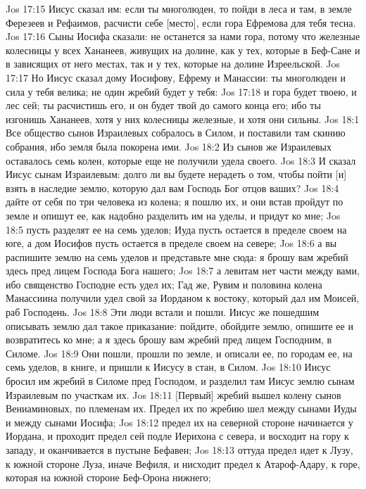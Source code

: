Jos 17:15  Иисус сказал им: если ты многолюден, то пойди в леса и там, в земле Ферезеев и Рефаимов, расчисти себе [место], если гора Ефремова для тебя тесна.
Jos 17:16  Сыны Иосифа сказали: не останется за нами гора, потому что железные колесницы у всех Хананеев, живущих на долине, как у тех, которые в Беф-Сане и в зависящих от него местах, так и у тех, которые на долине Изреельской.
Jos 17:17  Но Иисус сказал дому Иосифову, Ефрему и Манассии: ты многолюден и сила у тебя велика; не один жребий будет у тебя:
Jos 17:18  и гора будет твоею, и лес сей; ты расчистишь его, и он будет твой до самого конца его; ибо ты изгонишь Хананеев, хотя у них колесницы железные, и хотя они сильны.
Jos 18:1  Все общество сынов Израилевых собралось в Силом, и поставили там скинию собрания, ибо земля была покорена ими.
Jos 18:2  Из сынов же Израилевых оставалось семь колен, которые еще не получили удела своего.
Jos 18:3  И сказал Иисус сынам Израилевым: долго ли вы будете нерадеть о том, чтобы пойти [и] взять в наследие землю, которую дал вам Господь Бог отцов ваших?
Jos 18:4  дайте от себя по три человека из колена; я пошлю их, и они встав пройдут по земле и опишут ее, как надобно разделить им на уделы, и придут ко мне;
Jos 18:5  пусть разделят ее на семь уделов; Иуда пусть остается в пределе своем на юге, а дом Иосифов пусть остается в пределе своем на севере;
Jos 18:6  а вы распишите землю на семь уделов и представьте мне сюда: я брошу вам жребий здесь пред лицем Господа Бога нашего;
Jos 18:7  а левитам нет части между вами, ибо священство Господне есть удел их; Гад же, Рувим и половина колена Манассиина получили удел свой за Иорданом к востоку, который дал им Моисей, раб Господень.
Jos 18:8  Эти люди встали и пошли. Иисус же пошедшим описывать землю дал такое приказание: пойдите, обойдите землю, опишите ее и возвратитесь ко мне; а я здесь брошу вам жребий пред лицем Господним, в Силоме.
Jos 18:9  Они пошли, прошли по земле, и описали ее, по городам ее, на семь уделов, в книге, и пришли к Иисусу в стан, в Силом.
Jos 18:10  Иисус бросил им жребий в Силоме пред Господом, и разделил там Иисус землю сынам Израилевым по участкам их.
Jos 18:11  [Первый] жребий вышел колену сынов Вениаминовых, по племенам их. Предел их по жребию шел между сынами Иуды и между сынами Иосифа;
Jos 18:12  предел их на северной стороне начинается у Иордана, и проходит предел сей подле Иерихона с севера, и восходит на гору к западу, и оканчивается в пустыне Бефавен;
Jos 18:13  оттуда предел идет к Лузу, к южной стороне Луза, иначе Вефиля, и нисходит предел к Атароф-Адару, к горе, которая на южной стороне Беф-Орона нижнего;
